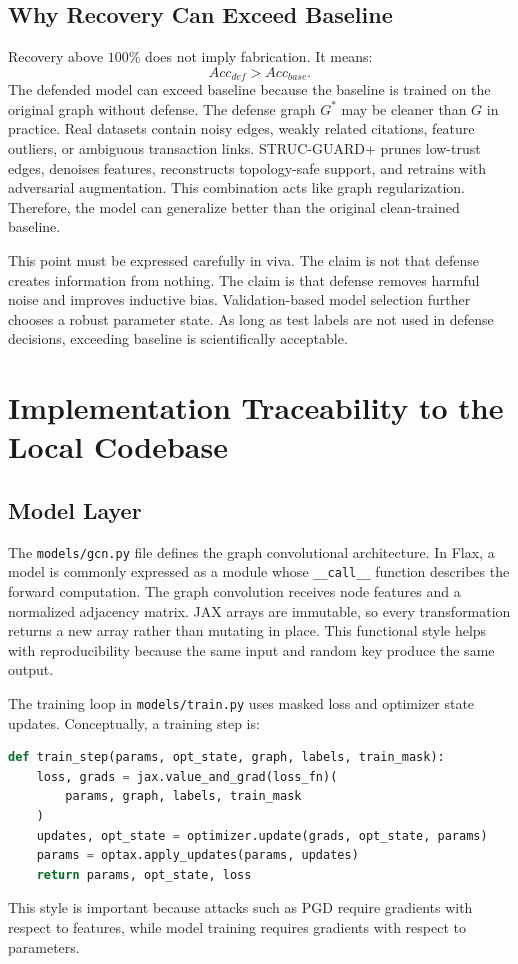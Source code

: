\documentclass[12pt,oneside]{report}
\begin{document}
\section{Why Recovery Can Exceed Baseline}
Recovery above $100\%$ does not imply fabrication. It means:
$$
Acc_{def}>Acc_{base}.
$$
The defended model can exceed baseline because the baseline is trained on the original graph without defense. The defense graph $G^*$ may be cleaner than $G$ in practice. Real datasets contain noisy edges, weakly related citations, feature outliers, or ambiguous transaction links. STRUC-GUARD+ prunes low-trust edges, denoises features, reconstructs topology-safe support, and retrains with adversarial augmentation. This combination acts like graph regularization. Therefore, the model can generalize better than the original clean-trained baseline.

This point must be expressed carefully in viva. The claim is not that defense creates information from nothing. The claim is that defense removes harmful noise and improves inductive bias. Validation-based model selection further chooses a robust parameter state. As long as test labels are not used in defense decisions, exceeding baseline is scientifically acceptable.

\chapter{Implementation Traceability to the Local Codebase}

\section{Model Layer}
The \texttt{models/gcn.py} file defines the graph convolutional architecture. In Flax, a model is commonly expressed as a module whose \texttt{\_\_call\_\_} function describes the forward computation. The graph convolution receives node features and a normalized adjacency matrix. JAX arrays are immutable, so every transformation returns a new array rather than mutating in place. This functional style helps with reproducibility because the same input and random key produce the same output.

The training loop in \texttt{models/train.py} uses masked loss and optimizer state updates. Conceptually, a training step is:
\begin{lstlisting}[language=Python]
def train_step(params, opt_state, graph, labels, train_mask):
    loss, grads = jax.value_and_grad(loss_fn)(
        params, graph, labels, train_mask
    )
    updates, opt_state = optimizer.update(grads, opt_state, params)
    params = optax.apply_updates(params, updates)
    return params, opt_state, loss
\end{lstlisting}
This style is important because attacks such as PGD require gradients with respect to features, while model training requires gradients with respect to parameters.
\end{document}
